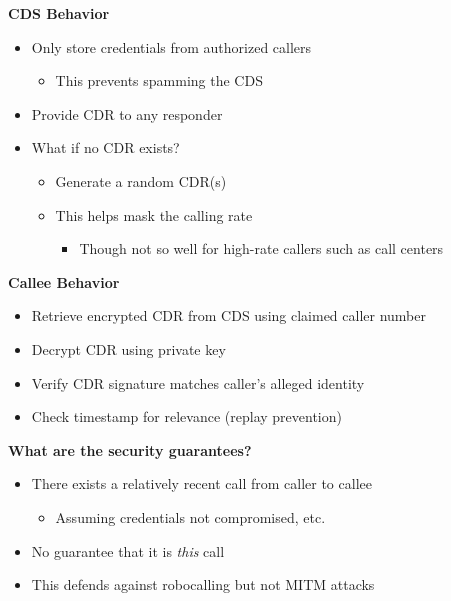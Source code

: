 \documentclass[helvetica]{seminar}
\newcommand{\heading}[1]{%
  \begin{center} 
    \large\bf 
    #1 
  \end{center} 
  \vspace{.4 in}}
\begin{document}
\begin{slide}
\heading{CDS Behavior}

\begin{itemize}
\item Only store credentials from authorized callers
  \begin{itemize}
  \item This prevents spamming the CDS
  \end{itemize}

\item Provide CDR to any responder
\item What if no CDR exists?
  \begin{itemize}
  \item Generate a random CDR(s)
  \item This helps mask the calling rate
    \begin{itemize}
    \item Though not so well for high-rate callers such as call centers
    \end{itemize}
  \end{itemize}
\end{itemize}
\end{slide}

\begin{slide}
\heading{Callee Behavior}

\begin{itemize}
\item Retrieve encrypted CDR from CDS using claimed caller number
\item Decrypt CDR using private key
\item Verify CDR signature matches caller's alleged identity
\item Check timestamp for relevance (replay prevention)
\end{itemize}
\end{slide}


\begin{slide}
\heading{What are the security guarantees?}

\begin{itemize}
\item There exists a relatively recent call from caller to callee
  \begin{itemize}
  \item Assuming credentials not compromised, etc.
  \end{itemize}

\item No guarantee that it is \emph{this} call
\item This defends against robocalling but not MITM attacks
\end{itemize}

\end{slide}
\end{document}
